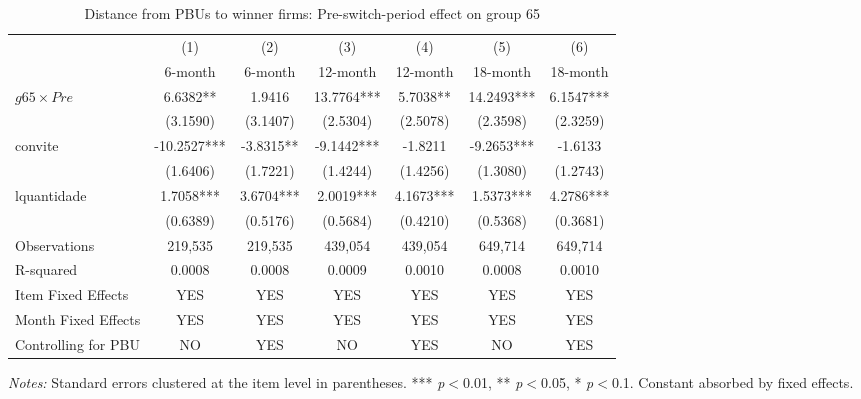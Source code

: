 \begin{table}[htbp]
\centering
\caption{Distance from PBUs to winner firms: Pre-switch-period effect on group 65}
\label{tab:distance}
\begin{adjustbox}{max width=\textwidth}
\begin{threeparttable}
\small
\begin{tabular}{lcccccc}
\toprule
 & (1) & (2) & (3) & (4) & (5) & (6) \\
 & 6-month & 6-month & 12-month & 12-month & 18-month & 18-month \\
\midrule
$g65 \times Pre$ & 6.6382** & 1.9416 & 13.7764*** & 5.7038** & 14.2493*** & 6.1547*** \\
 & (3.1590) & (3.1407) & (2.5304) & (2.5078) & (2.3598) & (2.3259) \\
convite & -10.2527*** & -3.8315** & -9.1442*** & -1.8211 & -9.2653*** & -1.6133 \\
 & (1.6406) & (1.7221) & (1.4244) & (1.4256) & (1.3080) & (1.2743) \\
lquantidade & 1.7058*** & 3.6704*** & 2.0019*** & 4.1673*** & 1.5373*** & 4.2786*** \\
 & (0.6389) & (0.5176) & (0.5684) & (0.4210) & (0.5368) & (0.3681) \\
\midrule
Observations & 219,535 & 219,535 & 439,054 & 439,054 & 649,714 & 649,714 \\
R-squared & 0.0008 & 0.0008 & 0.0009 & 0.0010 & 0.0008 & 0.0010 \\
Item Fixed Effects & YES & YES & YES & YES & YES & YES \\
Month Fixed Effects & YES & YES & YES & YES & YES & YES \\
Controlling for PBU & NO & YES & NO & YES & NO & YES \\
\bottomrule
\end{tabular}
\begin{tablenotes}
\small
\item \textit{Notes:} Standard errors clustered at the item level in parentheses.
*** \textit{p}$<$0.01, ** \textit{p}$<$0.05, * \textit{p}$<$0.1.
Constant absorbed by fixed effects.
\end{tablenotes}
\end{threeparttable}
\end{adjustbox}
\end{table}
